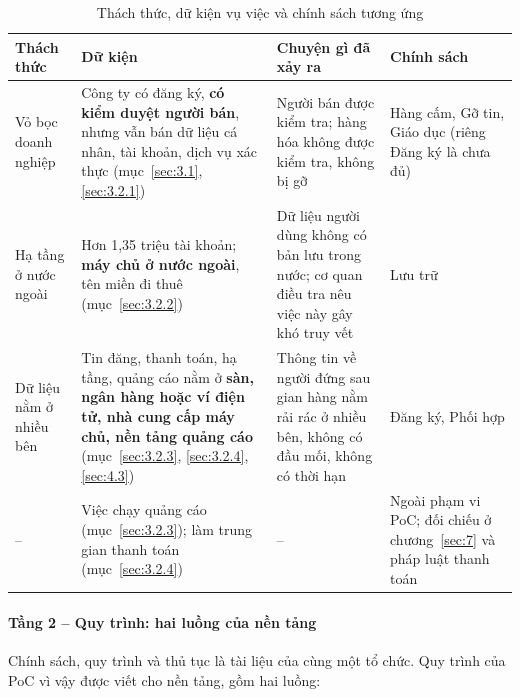 {\small{}
\begin{table}[H]
\centering
\caption{Thách thức, dữ kiện vụ việc và chính sách tương ứng}\label{tab:5.csdk}
\begin{tabularx}{\textwidth}{>{\hsize=0.7\hsize\raggedright\arraybackslash}X>{\hsize=1.3\hsize\raggedright\arraybackslash}X>{\hsize=1.1\hsize\raggedright\arraybackslash}X>{\hsize=0.9\hsize\raggedright\arraybackslash}X}
\toprule
\textbf{Thách thức} & \textbf{Dữ kiện} & \textbf{Chuyện gì đã xảy ra} & \textbf{Chính sách} \\
\midrule
Vỏ bọc doanh nghiệp & Công ty có đăng ký, \textbf{có kiểm duyệt người bán}, nhưng vẫn bán dữ liệu cá nhân, tài khoản, dịch vụ xác thực (mục~\ref{sec:3.1}, \ref{sec:3.2.1}) & Người bán được kiểm tra; hàng hóa không được kiểm tra, không bị gỡ & Hàng cấm, Gỡ tin, Giáo dục (riêng Đăng ký là chưa đủ) \\
Hạ tầng ở nước ngoài & Hơn 1,35 triệu tài khoản; \textbf{máy chủ ở nước ngoài}, tên miền đi thuê (mục~\ref{sec:3.2.2}) & Dữ liệu người dùng không có bản lưu trong nước; cơ quan điều tra nêu việc này gây khó truy vết & Lưu trữ \\
Dữ liệu nằm ở nhiều bên & Tin đăng, thanh toán, hạ tầng, quảng cáo nằm ở \textbf{sàn, ngân hàng hoặc ví điện tử, nhà cung cấp máy chủ, nền tảng quảng cáo} (mục~\ref{sec:3.2.3}, \ref{sec:3.2.4}, \ref{sec:4.3}) & Thông tin về người đứng sau gian hàng nằm rải rác ở nhiều bên, không có đầu mối, không có thời hạn & Đăng ký, Phối hợp \\
-- & Việc chạy quảng cáo (mục~\ref{sec:3.2.3}); làm trung gian thanh toán (mục~\ref{sec:3.2.4}) & -- & Ngoài phạm vi PoC; đối chiếu ở chương~\ref{sec:7} và pháp luật thanh toán \\
\bottomrule
\end{tabularx}
\end{table}}

\paragraph{Tầng 2 -- Quy trình: hai luồng của nền tảng}

Chính sách, quy trình và thủ tục là tài liệu của cùng một tổ chức. Quy trình của PoC vì vậy được viết cho nền tảng, gồm hai luồng:

